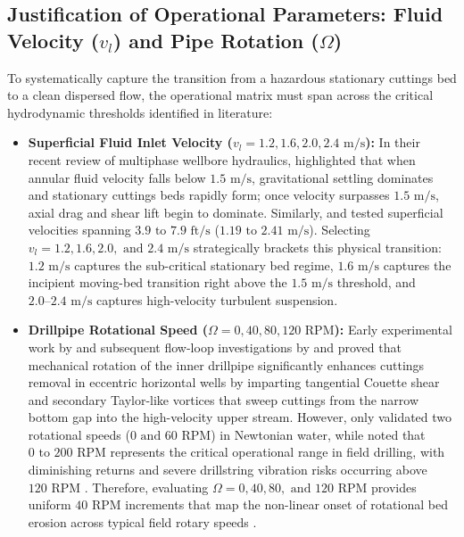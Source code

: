 \subsection{Justification of Operational Parameters: Fluid Velocity ($v_l$) and Pipe Rotation ($\Omega$)}
To systematically capture the transition from a hazardous stationary cuttings bed to a clean dispersed flow, the operational matrix must span across the critical hydrodynamic thresholds identified in literature:
\begin{itemize}
    \item \textbf{Superficial Fluid Inlet Velocity ($v_l = 1.2, 1.6, 2.0, 2.4\text{ m/s}$):} In their recent review of multiphase wellbore hydraulics, \citet{Khalili2025} highlighted that when annular fluid velocity falls below $1.5\text{ m/s}$, gravitational settling dominates and stationary cuttings beds rapidly form; once velocity surpasses $1.5\text{ m/s}$, axial drag and shear lift begin to dominate. Similarly, \citet{Osgouei2010} and \citet{Shehab2015} tested superficial velocities spanning $3.9\text{ to } 7.9\text{ ft/s}$ ($1.19\text{ to } 2.41\text{ m/s}$). Selecting $v_l = 1.2, 1.6, 2.0,\text{ and } 2.4\text{ m/s}$ strategically brackets this physical transition: $1.2\text{ m/s}$ captures the sub-critical stationary bed regime, $1.6\text{ m/s}$ captures the incipient moving-bed transition right above the $1.5\text{ m/s}$ threshold, and $2.0\text{--}2.4\text{ m/s}$ captures high-velocity turbulent suspension.
    \item \textbf{Drillpipe Rotational Speed ($\Omega = 0, 40, 80, 120\text{ RPM}$):} Early experimental work by \citet{Sanchez1999} and subsequent flow-loop investigations by \citet{Sorgun2010} and \citet{Osgouei2010} proved that mechanical rotation of the inner drillpipe significantly enhances cuttings removal in eccentric horizontal wells by imparting tangential Couette shear and secondary Taylor-like vortices that sweep cuttings from the narrow bottom gap into the high-velocity upper stream. However, \citet{Shehab2015} only validated two rotational speeds ($0\text{ and } 60\text{ RPM}$) in Newtonian water, while \citet{Khaled2021} noted that $0\text{ to } 200\text{ RPM}$ represents the critical operational range in field drilling, with diminishing returns and severe drillstring vibration risks occurring above $120\text{ RPM}$ \citep{Hajipour2020}. Therefore, evaluating $\Omega = 0, 40, 80,\text{ and } 120\text{ RPM}$ provides uniform $40\text{ RPM}$ increments that map the non-linear onset of rotational bed erosion across typical field rotary speeds \citep{Osgouei2010, Hajipour2020}.
\end{itemize}

